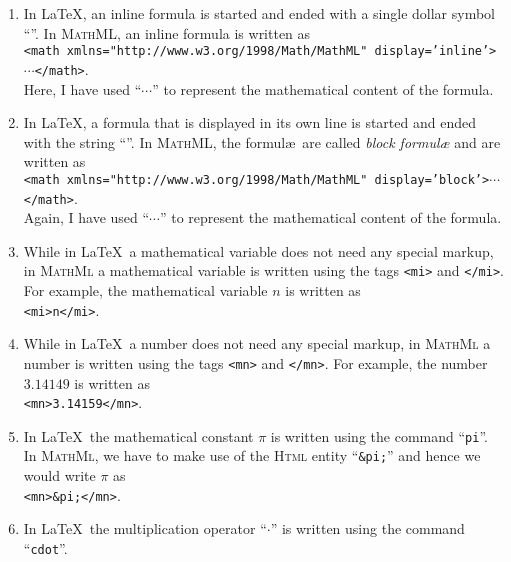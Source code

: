 \begin{enumerate}
\item In \LaTeX, an inline formula is started and ended with a single dollar symbol
      ``\texttt{}''.  
      In \textsc{MathML}, an inline formula is written as
      \\[0.2cm]
      \hspace*{1.3cm}
      \texttt{<math xmlns="http://www.w3.org/1998/Math/MathML" display='inline'>$\cdots$</math>}.
      \\[0.2cm]
      Here, I have used ``$\cdots$'' to represent the mathematical content of the formula.
\item In \LaTeX, a formula that is displayed in its own line is started and ended with the string
      ``\texttt{}''.  
      In \textsc{MathML}, the formul\ae\ are called \emph{block formul\ae} and are written as
      \\[0.2cm]
      \hspace*{1.3cm}
      \texttt{<math xmlns="http://www.w3.org/1998/Math/MathML" display='block'>$\cdots$</math>}.
      \\[0.2cm]
      Again, I have used ``$\cdots$'' to represent the mathematical content of the formula.
\item While in \LaTeX\ a mathematical variable does not need any special markup, in \textsc{MathMl}
      a mathematical variable is written using the tags 
      \texttt{<mi>} and \texttt{</mi>}.  For example, the mathematical variable $n$ is written as    
      \\[0.2cm]
      \hspace*{1.3cm}
      \texttt{<mi>n</mi>}.
\item While in \LaTeX\ a number does not need any special markup, in \textsc{MathMl}
      a number is written using the tags 
      \texttt{<mn>} and \texttt{</mn>}.  For example, the number $3.14149$ is written as    
      \\[0.2cm]
      \hspace*{1.3cm}
      \texttt{<mn>3.14159</mn>}.
\item In \LaTeX\ the mathematical constant $\pi$ is written using the command ``\texttt{pi}''.
      In \textsc{MathMl}, we have to make use of the \textsc{Html} entity ``\texttt{\&pi;}'' and
      hence we would write $\pi$ as
      \\[0.2cm]
      \hspace*{1.3cm}
      \texttt{<mn>\&pi;</mn>}.
\item In \LaTeX\ the multiplication operator ``$\cdot$'' is written using the command ``\texttt{cdot}''.

\end{enumerate}
